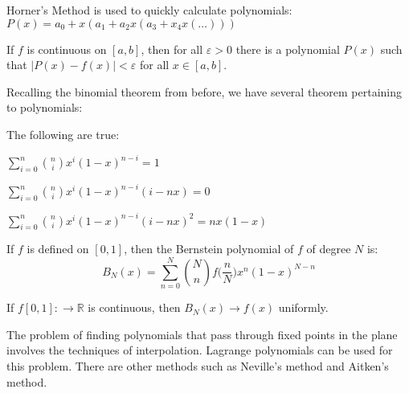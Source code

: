         Horner's Method is used to quickly calculate
        polynomials:
        $P(x)=a_{0}+x(a_{1}+a_{2}x(a_{3}+x_{4}x(\hdots)))$
        \begin{theorem}
            If $f$ is continuous on $[a,b]$, then for all
            $\varepsilon>0$ there is a polynomial $P(x)$
            such that $|P(x)-f(x)|<\varepsilon$ for all
            $x\in[a,b]$.
        \end{theorem}
        Recalling the binomial theorem from before, we have
        several theorem pertaining to polynomials:
        \begin{theorem}
            The following are true:
            \begin{enumerate}
                \begin{multicols}{2}
                    \item $\sum_{i=0}^{n}%
                           \binom{n}{i}x^{i}(1-x)^{n-i}=1$
                    \item $\sum_{i=0}^{n}%
                           \binom{n}{i}x^{i}(1-x)^{n-i}%
                           (i-nx)=0$
                    \item $\sum_{i=0}^{n}%
                           \binom{n}{i}x^{i}(1-x)^{n-i}%
                           (i-nx)^{2}=nx(1-x)$
                \end{multicols}
            \end{enumerate}
        \end{theorem}
        \begin{definition}
            If $f$ is defined on $[0,1]$, then the Bernstein
            polynomial of $f$ of degree $N$ is:
            \begin{equation*}
                B_{N}(x)=\sum_{n=0}^{N}\binom{N}{n}
                    f\Big(\frac{n}{N}\Big)
                    x^{n}(1-x)^{N-n}
            \end{equation*}
        \end{definition}
        \begin{theorem}
            If $f[0,1]:\rightarrow\mathbb{R}$ is
            continuous, then $B_{N}(x)\rightarrow{f(x)}$
            uniformly.
        \end{theorem}
        The problem of finding polynomials that pass through
        fixed points in the plane involves the
        techniques of interpolation. Lagrange polynomials can
        be used for this problem. There are other methods such
        as Neville's method and Aitken's method.
